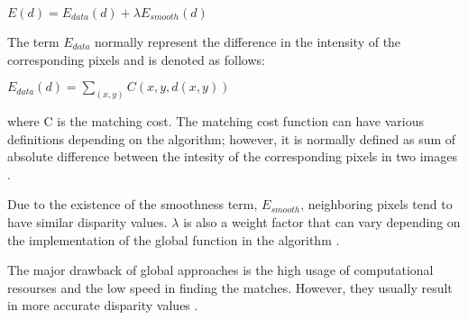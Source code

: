 \documentclass[dvips,letterpaper,12pt]{report}
\begin{document}
\begin{center}
$E(d)=E_{data}(d)+\lambda E_{smooth}(d)$
\end{center}
The term $E_{data}$ normally represent the difference in the intensity of the corresponding pixels and is denoted as follows:

\begin{center}
$E_{data}(d) = \sum_{(x,y)}C(x,y,d(x,y))$
\end{center}

where C is the matching cost. The matching cost function can have various definitions depending on the algorithm; however, it is normally defined as sum of absolute difference 
between the intesity of the corresponding pixels in two images \cite{sch02}.

Due to the existence of the smoothness term, $E_{smooth}$, neighboring pixels tend to have similar disparity values. $\lambda$ is also a weight factor that can vary depending 
on the implementation of the global function in the algorithm \cite{sze11}.


The major drawback of global approaches is the high usage of computational resourses and the low speed in finding the matches. However, they usually result in more accurate disparity values
\cite{hirsch02,sze11}. 




 
\end{document}
